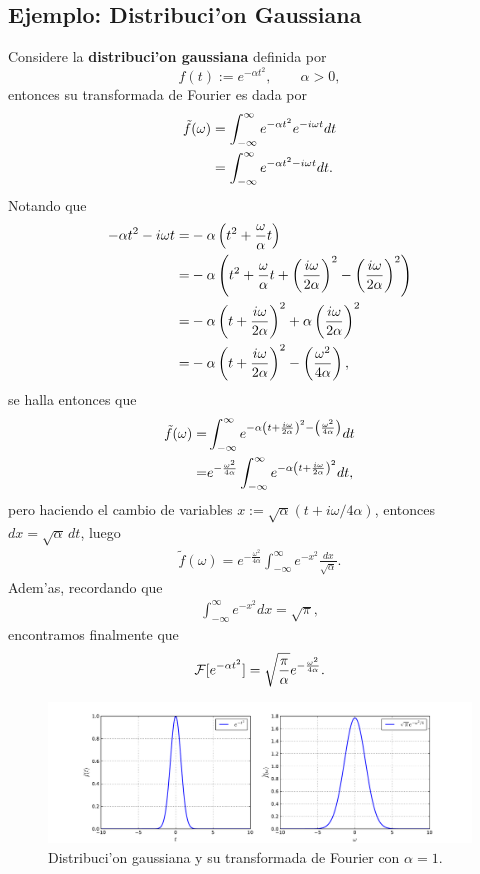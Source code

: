 \subsection{Ejemplo: Distribuci'on Gaussiana}
Considere la \textbf{distribuci'on gaussiana} definida por
\begin{equation}\label{fgauss}
f(t):= e^{-\alpha t^2}, \qquad \alpha>0,
\end{equation}
entonces su transformada de Fourier es dada por
\begin{align}
\tilde{f}(\omega) &= \int_{-\infty}^{\infty}e^{-\alpha t^2} e^{-i \omega t}dt\notag \\
&= \int_{-\infty}^{\infty}e^{-\alpha t^2-i\omega t} dt.
\end{align}
Notando que
\begin{align}
-\alpha t^2-i\omega t=&-\alpha \left(t^2+\frac{\omega}{\alpha}t\right) \notag \\
=&-\alpha\left(t^2+\frac{\omega}{\alpha}t+\left(\frac{i\omega}{2\alpha}\right)^2-\left(\frac{i\omega}{2\alpha}\right)^2\right) \notag \\
=&-\alpha \left( t+\frac{i\omega}{2\alpha} \right)^2+\alpha\left(\frac{i\omega}{2\alpha}\right)^2\notag \\
=&-\alpha \left( t+\frac{i\omega}{2\alpha} \right)^2-\left(\frac{\omega^2}{4\alpha}\right),
\end{align}
se halla entonces que
\begin{align}
\tilde{f}(\omega)=&\int_{-\infty}^{\infty}e^{-\alpha \left( t+\frac{i\omega}{2\alpha} \right)^2-\left(\frac{\omega^2}{4\alpha}\right)}dt\notag\\
=& e^{-\frac{\omega^2}{4\alpha}}\int_{-\infty}^{\infty}e^{-\alpha \left( t+\frac{i\omega}{2\alpha} \right)^2}dt,
\end{align}
pero haciendo el cambio de variables $x:=\sqrt{\alpha}(t+i\omega/4\alpha)$, entonces $dx=\sqrt{\alpha}\,dt$, luego
\begin{align}
\tilde{f}(\omega)=e^{-\frac{\omega^2}{4\alpha}}\int_{-\infty}^{\infty}e^{-x^2} \frac{dx}{\sqrt{\alpha}}.
\end{align}
Adem'as, recordando que
\begin{align}
\int_{-\infty}^{\infty}e^{-x^2}dx=\sqrt{\pi},
\end{align}
encontramos finalmente que
\begin{equation}\label{Tfgauss}
{\cal F}[e^{-\alpha t^2}]=\sqrt{\frac{\pi}{\alpha}}e^{-\frac{\omega^2}{4\alpha}}.
\end{equation}
\begin{figure}[h]
\centering
\includegraphics[scale=0.4]{figs/fig-Fourier-Gaussiana.pdf}
\caption{Distribuci'on gaussiana y su transformada de Fourier con $\alpha=1$.}
\label{im:gaussiana}
\end{figure}

